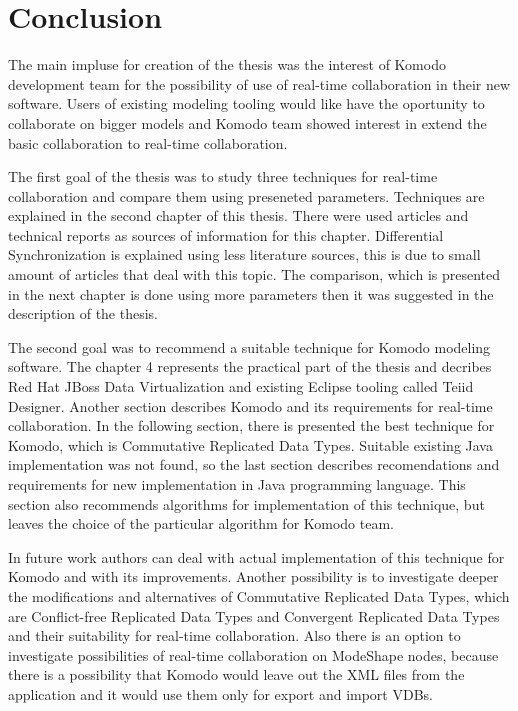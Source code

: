 \documentclass[12pt,oneside]{fithesis2}
\begin{document}
\chapter{Conclusion}
\par The main impluse for creation of the thesis was the interest of Komodo development team for the possibility of use of real-time collaboration in their new software. Users of existing modeling tooling would like have the oportunity to collaborate on bigger models and Komodo team showed interest in extend the basic collaboration to real-time collaboration.
\par The first goal of the thesis was to study three techniques for real-time collaboration and compare them using preseneted parameters. Techniques are explained in the second chapter of this thesis. There were used articles and technical reports as sources of information for this chapter. Differential Synchronization is explained using less literature sources, this is due to small amount of articles that deal with this topic. The comparison, which is presented in the next chapter is done using more parameters then it was suggested in the description of the thesis. 
\par The second goal was to recommend a suitable technique for Komodo modeling software. The chapter 4 represents the practical part of the thesis and decribes Red Hat JBoss Data Virtualization and existing Eclipse tooling called Teiid Designer. Another section describes Komodo and its requirements for real-time collaboration. In the following section, there is presented the best technique for Komodo, which is Commutative Replicated Data Types. Suitable existing Java implementation was not found, so the last section describes recomendations and requirements for new implementation in Java programming language. This section also recommends algorithms for implementation of this technique, but leaves the choice of the particular algorithm for Komodo team.
\par In future work authors can deal with actual implementation of this technique for Komodo and with its improvements. Another possibility is to investigate deeper the modifications and alternatives of Commutative Replicated Data Types, which are Conflict-free Replicated Data Types and Convergent Replicated Data Types and their suitability for real-time collaboration. Also there is an option to investigate possibilities of real-time collaboration on ModeShape nodes, because there is a possibility that Komodo would leave out the XML files from the application and it would use them only for export and import VDBs.
 
 
\end{document}
